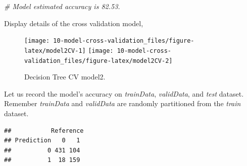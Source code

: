\documentclass[
]{book}
\newenvironment{Shaded}{\begin{snugshade}}{\end{snugshade}}
\newcommand{\CommentTok}[1]{\textcolor[rgb]{0.56,0.35,0.01}{\textit{#1}}}
\newcommand{\DataTypeTok}[1]{\textcolor[rgb]{0.13,0.29,0.53}{#1}}
\newcommand{\DecValTok}[1]{\textcolor[rgb]{0.00,0.00,0.81}{#1}}
\newcommand{\KeywordTok}[1]{\textcolor[rgb]{0.13,0.29,0.53}{\textbf{#1}}}
\newcommand{\NormalTok}[1]{#1}
\newcommand{\OperatorTok}[1]{\textcolor[rgb]{0.81,0.36,0.00}{\textbf{#1}}}
\newcommand{\StringTok}[1]{\textcolor[rgb]{0.31,0.60,0.02}{#1}}
\begin{document}
\begin{Shaded}
\begin{Highlighting}[]
\CommentTok{# Model estimated accuracy is 82.53.}
\end{Highlighting}
\end{Shaded}

Display details of the cross validation model,

\begin{Shaded}
\end{Shaded}

\begin{figure}

{\centering \texttt{[image: 10-model-cross-validation\_files/figure-latex/model2CV-1]} \texttt{[image: 10-model-cross-validation\_files/figure-latex/model2CV-2]} 

}

\caption{Decision Tree CV model2.}\label{fig:model2CV}
\end{figure}

Let us record the model's accuracy on \emph{trainData}, \emph{validData}, and \emph{test} dataset. Remember \emph{trainData} and \emph{validData} are randomly partitioned from the \emph{train} dataset.

\begin{Shaded}
\end{Shaded}

\begin{verbatim}
##           Reference
## Prediction   0   1
##          0 431 104
##          1  18 159
\end{verbatim}

\begin{Shaded}
\end{Shaded}
\end{document}
